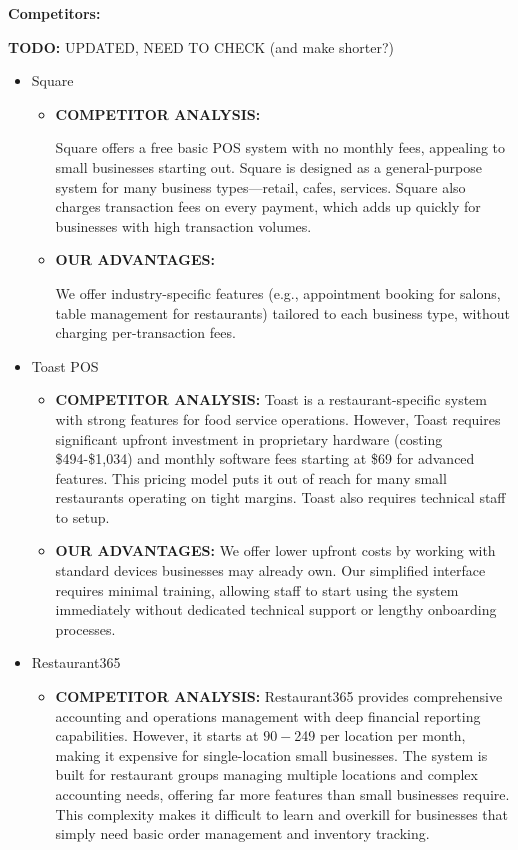 \documentclass[]{VUMIFTemplateClass}
\newcommand{\todocomment}[1]{%
    \begin{tcolorbox}[colback=red!20, colframe=red!60, arc=0pt, outer arc=0pt, boxrule=1pt, left=3pt, right=3pt, top=3pt, bottom=3pt]
        \textbf{\textcolor{orange!70!black}{TODO:}} #1
    \end{tcolorbox}
}
\begin{document}
\textbf{Competitors:}
\todocomment{UPDATED, NEED TO CHECK (and make shorter?)}
\begin{itemize}
    \item Square
    \begin{itemize}
        \item \textbf{COMPETITOR ANALYSIS:}
        
        Square offers a free basic POS system with no monthly fees, appealing to
        small businesses starting out. Square is designed as a general-purpose
        system for many business types—retail, cafes, services. Square also
        charges transaction fees on every payment, which adds up quickly for
        businesses with high transaction volumes.

        \item {\textbf{OUR ADVANTAGES:} 
        
        We offer industry-specific features (e.g., appointment booking for
        salons, table management for restaurants) tailored to each business
        type, without charging per-transaction fees.}

    \end{itemize}
    

    \item {Toast POS}
    \begin{itemize}
        \item  \textbf{COMPETITOR ANALYSIS:}
        Toast is a restaurant-specific system with strong
        features for food service operations. However, Toast requires significant
        upfront investment in proprietary hardware (costing \$494-\$1,034) and monthly
        software fees starting at \$69 for advanced features. This pricing model
        puts it out of reach for many small restaurants operating on tight margins.
        Toast also requires technical staff to setup.

        \item  \textbf{OUR ADVANTAGES:} 
        We offer lower upfront costs by working with
        standard devices businesses may already own. Our simplified interface
        requires minimal training, allowing staff to start using the system
        immediately without dedicated technical support or lengthy onboarding
        processes.
    \end{itemize}
    
    \item Restaurant365
    \begin{itemize}
        \item \textbf{COMPETITOR ANALYSIS:}
        Restaurant365 provides comprehensive
        accounting and operations management with deep financial reporting
        capabilities. However, it starts at $90-$249 per location per month, making
        it expensive for single-location small businesses. The system is built for
        restaurant groups managing multiple locations and complex accounting needs,
        offering far more features than small businesses require. This complexity
        makes it difficult to learn and overkill for businesses that simply need
        basic order management and inventory tracking.


\end{itemize}
\end{itemize}
\end{document}
